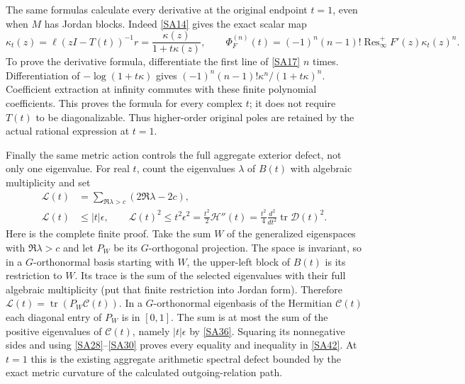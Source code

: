 \documentclass[11pt]{article}
\newcommand{\tr}{\operatorname{tr}}\newcommand{\Res}{\operatorname{Res}}
\begin{document}
The same formulas calculate every derivative at the
original endpoint $t=1$, even when $M$ has Jordan blocks.
Indeed \eqref{SA14} gives the exact scalar map
\begin{equation}\tag{SA41}\label{SA41}
\kappa_t(z)=\ell(zI-T(t))^{-1}r
=\frac{\kappa(z)}{1+t\kappa(z)},\qquad
\Phi_F^{(n)}(t)=(-1)^n(n-1)!
\Res_\infty^+F'(z)\kappa_t(z)^n .
\end{equation}
To prove the derivative formula, differentiate the first
line of \eqref{SA17} $n$ times. Differentiation of
$-\log(1+t\kappa)$ gives
$(-1)^n(n-1)!\kappa^n/(1+t\kappa)^n$.
Coefficient extraction at infinity commutes with these
finite polynomial coefficients. This proves the formula
for every complex $t$; it does not require $T(t)$ to be
diagonalizable. Thus higher-order original poles are
retained by the actual rational expression at $t=1$.

Finally the same metric action controls the full
aggregate exterior defect, not only one eigenvalue.
For real $t$, count the eigenvalues $\lambda$ of $B(t)$
with algebraic multiplicity and set
\begin{equation}\tag{SA42}\label{SA42}
\begin{split}
\mathcal L(t)&=\sum_{\Re\lambda>c}
                   (2\Re\lambda-2c),\\
\mathcal L(t)&\leq |t|\epsilon,\qquad
\mathcal L(t)^2\leq
t^2\epsilon^2
=\frac{t^2}{2}\mathcal H''(t)
=\frac{t^2}{4}\frac{d^2}{dt^2}\tr\mathscr D(t)^2.
\end{split}
\end{equation}
Here is the complete finite proof. Take the sum $W$ of
the generalized eigenspaces with $\Re\lambda>c$ and
let $P_W$ be its $G$-orthogonal projection. The space
is invariant, so in a $G$-orthonormal basis starting
with $W$, the upper-left block of $B(t)$ is its
restriction to $W$. Its trace is the sum of the
selected eigenvalues with their full algebraic
multiplicity (put that finite restriction into Jordan
form). Therefore
$\mathcal L(t)=\tr(P_W\mathcal C(t))$.
In a $G$-orthonormal eigenbasis of the Hermitian
$\mathcal C(t)$ each diagonal entry of $P_W$ is in
$[0,1]$. The sum is at most the sum of the positive
eigenvalues of $\mathcal C(t)$, namely $|t|\epsilon$
by \eqref{SA36}. Squaring its nonnegative sides and
using \eqref{SA28}--\eqref{SA30} proves every equality
and inequality in \eqref{SA42}. At $t=1$ this is the
existing aggregate arithmetic spectral defect
bounded by the exact metric curvature of the
calculated outgoing-relation path.
\end{document}
